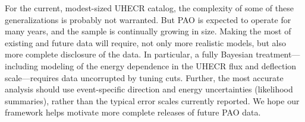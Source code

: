 For the current, modest-sized UHECR catalog, the complexity of
some of these generalizations  is probably not warranted.  But PAO is
expected to operate for many years, and the sample is continually growing in
size.  Making the most of existing and future data will require, not only
more realistic models, but also more complete disclosure of the data.
In particular, a fully Bayesian treatment---including modeling of the energy
dependence in the UHECR flux and deflection scale---requires data
uncorrupted by tuning cuts.  Further, the most accurate analysis should use
event-specific direction and energy uncertainties (likelihood summaries),
rather than the typical error scales currently reported.  We hope 
our framework helps motivate more complete releases of future PAO data.
